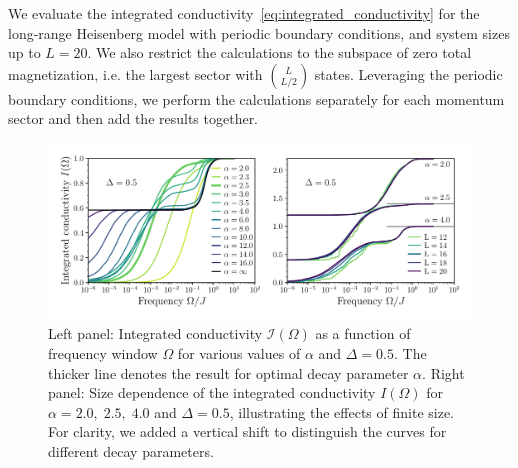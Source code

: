 We evaluate the integrated conductivity~\eqref{eq:integrated_conductivity} for the long-range Heisenberg model
with periodic boundary conditions, and system sizes up to \(L=20\). We also restrict the calculations to the
subspace of zero total magnetization, i.e. the largest sector with \(\binom{L}{L/2}\) states. Leveraging
the periodic boundary conditions, we perform the calculations separately for each momentum sector and then
add the results together.

\begin{figure}[htbp]
  \centering
  \includegraphics[width=\linewidth]{Figures/optical_conductivity.pdf}
  \caption{Left panel: Integrated conductivity \(\mathcal{I}(\Omega)\) as a function of frequency window \(\Omega\) for various values of \(\alpha\)
  and \(\Delta = 0.5\). The thicker line denotes the result for optimal decay parameter \(\alpha\). Right panel: Size dependence
  of the integrated conductivity \(I(\Omega)\) for \(\alpha = 2.0, \; 2.5,\; 4.0\) and \(\Delta = 0.5\),
  illustrating the effects of finite size. For clarity, we added a vertical shift to distinguish the curves for different
  decay parameters.}
  \label{fig:optical_conductivity}
\end{figure}

